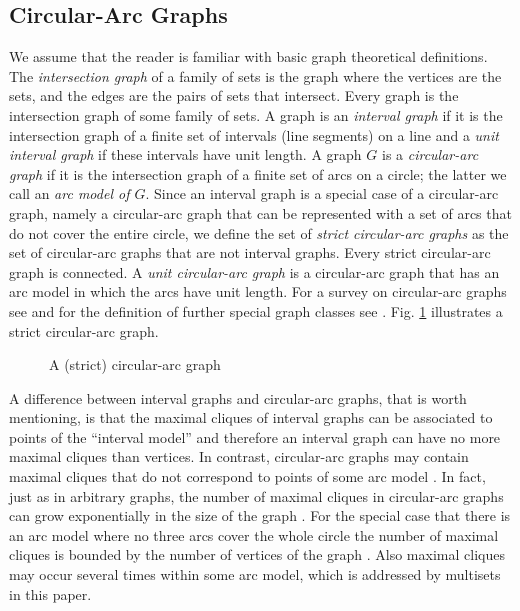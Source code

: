 \documentclass[10pt]{article}
\newcommand{\q}[1]{``#1''}\newcommand{\fu}[1]{\mathcal{#1}}\newcommand{\mc}[1]{\mathsf{#1}}\newcommand{\ri}[1]{\mathscr{#1}}\newcommand{\co}[1]{\fu{C}({#1})}\newcommand{\lc}[1]{\alpha(#1)}\newcommand{\rc}[1]{\beta(#1)}\newcommand{\ema}[1]{\mathcal{#1}}\newcommand{\fe}[2]{\fu{F}(#1,#2)}\newcommand{\lv}[1]{l_{#1}}\newcommand{\rv}[1]{r_{#1}}\newcommand{\mv}[1]{m_{#1}}\newcommand{\lvv}{\lv{v}}
\begin{document}
\subsection{Circular-Arc Graphs}\label{sub:CAG}


We assume that the reader is familiar with basic graph theoretical definitions.
The \emph{intersection graph} of a family of sets is the graph where the vertices are the sets, 
and the edges are the pairs of sets that intersect. Every graph is the intersection graph of 
some family of sets. A graph is an \emph{interval graph} if it is the intersection graph of a 
finite set of intervals (line segments) on a line and a \emph{unit interval graph} if these 
intervals have unit length.
A graph $G$ is a \emph{circular-arc graph} if it is the intersection graph of a finite set of 
arcs on a circle; the latter we call an \emph{arc model of $G$}.
Since an interval graph is a special case of a circular-arc graph, namely a circular-arc graph 
that can be represented with a set of arcs that do not cover the entire circle, we define the 
set of \emph{strict circular-arc graphs} as the set of circular-arc graphs that are not interval 
graphs. Every strict circular-arc graph is connected.
A \emph{unit circular-arc graph} is a circular-arc graph that has an arc model in which the 
arcs have unit length. For a survey on circular-arc graphs see \cite{Lin20095618} 
and for the definition of further special graph classes see \cite{BLS99}.
Fig. \ref{fig:animals} illustrates a strict circular-arc graph.


\begin{figure}[ht]
  \centering
   \vspace{-5pt}\caption{A (strict) circular-arc graph}
  \label{fig:animals}
\end{figure}


A difference between interval graphs and circular-arc graphs, that is worth mentioning, 
is that the maximal cliques of interval graphs can be associated to points of 
the \q{interval model} and therefore an interval graph can have no more maximal cliques 
than vertices. In contrast, circular-arc graphs may contain maximal cliques that do not 
correspond to points of  some arc model \cite{Lin20095618}.
In fact, just as in arbitrary graphs, the number of maximal cliques in circular-arc 
graphs can grow exponentially in the size of the graph \cite{firstCAG}. For
the special case that there is an arc model where no three arcs cover the whole
circle the number of maximal cliques is bounded by the
number of vertices of the graph \cite{CFZ08}. Also maximal cliques may
occur several times within some arc model, which is addressed by multisets in 
this paper.
\end{document}
